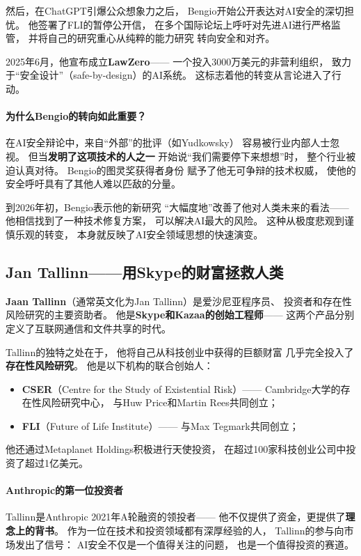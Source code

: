 然后，在ChatGPT引爆公众想象力之后，
Bengio开始公开表达对AI安全的深切担忧。
他签署了FLI的暂停公开信，
在多个国际论坛上呼吁对先进AI进行严格监管，
并将自己的研究重心从纯粹的能力研究
转向安全和对齐。

2025年6月，他宣布成立\textbf{LawZero}——
一个投入3000万美元的非营利组织，
致力于``安全设计''（safe-by-design）的AI系统。
这标志着他的转变从言论进入了行动。

\paragraph{为什么Bengio的转向如此重要？}
在AI安全辩论中，来自``外部''的批评（如Yudkowsky）
容易被行业内部人士忽视。
但当\textbf{发明了这项技术的人之一}
开始说``我们需要停下来想想''时，
整个行业被迫认真对待。
Bengio的图灵奖获得者身份
赋予了他无可争辩的技术权威，
使他的安全呼吁具有了其他人难以匹敌的分量。

到2026年初，Bengio表示他的新研究
``大幅度地''改善了他对人类未来的看法——
他相信找到了一种技术修复方案，
可以解决AI最大的风险。
这种从极度悲观到谨慎乐观的转变，
本身就反映了AI安全领域思想的快速演变。

\subsection{Jan Tallinn——用Skype的财富拯救人类}
\label{subsec:tallinn}

\textbf{Jaan Tallinn}（通常英文化为Jan Tallinn）是爱沙尼亚程序员、
投资者和存在性风险研究的主要资助者。
他是\textbf{Skype和Kazaa的创始工程师}——
这两个产品分别定义了互联网通信和文件共享的时代。

Tallinn的独特之处在于，
他将自己从科技创业中获得的巨额财富
几乎完全投入了\textbf{存在性风险研究}。
他是以下机构的联合创始人：
\begin{itemize}[noitemsep]
  \item \textbf{CSER}（Centre for the Study of Existential Risk）——
        Cambridge大学的存在性风险研究中心，
        与Huw Price和Martin Rees共同创立；
  \item \textbf{FLI}（Future of Life Institute）——
        与Max Tegmark共同创立；
\end{itemize}
他还通过Metaplanet Holdings积极进行天使投资，
在超过100家科技创业公司中投资了超过1亿美元。

\paragraph{Anthropic的第一位投资者}
Tallinn是Anthropic 2021年A轮融资的领投者——
他不仅提供了资金，更提供了\textbf{理念上的背书}。
作为一位在技术和投资领域都有深厚经验的人，
Tallinn的参与向市场发出了信号：
AI安全不仅是一个值得关注的问题，
也是一个值得投资的赛道。

